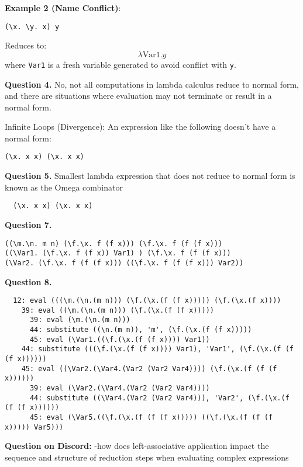 \documentclass{article}
\theoremstyle{theorem}
\theoremstyle{definition}
\theoremstyle{remark}
\begin{document}
\textbf{Example 2 (Name Conflict)}:
\begin{verbatim}
(\x. \y. x) y
\end{verbatim}
Reduces to: 
\[
\lambda \text{Var1}. y
\]
where \texttt{Var1} is a fresh variable generated to avoid conflict with \texttt{y}.


\textbf{Question 4.}
No, not all computations in lambda calculus reduce to normal form, and there are situations where evaluation may not terminate or result in a normal form.

Infinite Loops (Divergence): An expression like the following doesn't have a normal form:

\begin{verbatim}
(\x. x x) (\x. x x)
\end{verbatim}

\textbf{Question 5.}
Smallest lambda expression that does not reduce to normal form is known as the Omega combinator

\begin{verbatim}
  (\x. x x) (\x. x x)
\end{verbatim}

\textbf{Question 7.}

\begin{verbatim}
((\m.\n. m n) (\f.\x. f (f x))) (\f.\x. f (f (f x)))
((\Var1. (\f.\x. f (f x)) Var1) ) (\f.\x. f (f (f x)))
(\Var2. (\f.\x. f (f (f x))) ((\f.\x. f (f (f x))) Var2))
\end{verbatim}

\textbf{Question 8.}

\begin{verbatim}
  12: eval (((\m.(\n.(m n))) (\f.(\x.(f (f x))))) (\f.(\x.(f x))))
    39: eval ((\m.(\n.(m n))) (\f.(\x.(f (f x)))))
      39: eval (\m.(\n.(m n)))
      44: substitute ((\n.(m n)), 'm', (\f.(\x.(f (f x)))))
      45: eval (\Var1.((\f.(\x.(f (f x)))) Var1))
    44: substitute (((\f.(\x.(f (f x)))) Var1), 'Var1', (\f.(\x.(f (f (f x))))))
    45: eval ((\Var2.(\Var4.(Var2 (Var2 Var4)))) (\f.(\x.(f (f (f x))))))
      39: eval (\Var2.(\Var4.(Var2 (Var2 Var4))))
      44: substitute ((\Var4.(Var2 (Var2 Var4))), 'Var2', (\f.(\x.(f (f (f x))))))
      45: eval (\Var5.((\f.(\x.(f (f (f x))))) ((\f.(\x.(f (f (f x))))) Var5)))
\end{verbatim}


\textbf{Question on Discord:} -how does left-associative application impact the sequence and structure of reduction steps when evaluating complex expressions
\end{document}
